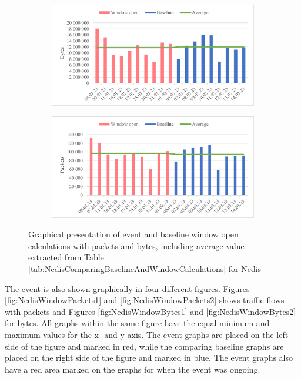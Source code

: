 \begin{figure}[H]
    \centering
    \begin{subfigure}{0.8\textwidth}
        \centering
        \includegraphics[width=1\hsize]{figures/Nedis_Window_Calculations_Bytes.png} 
    \end{subfigure}
    \begin{subfigure}{0.8\textwidth}
        \centering
        \includegraphics[width=1\hsize]{figures/Nedis_Window_Calculations_Packets.png} 
    \end{subfigure}
    \caption{Graphical presentation of event and baseline window open calculations with packets and bytes, including average value extracted from Table \ref{tab:NedisComparingBaselineAndWindowCalculations} for Nedis}
    \label{fig:NedisWindowCalculations}
\end{figure}

The event is also shown graphically in four different figures. Figures \ref{fig:NedisWindowPackets1} and \ref{fig:NedisWindowPackets2} shows traffic flows with packets and Figures \ref{fig:NedisWindowBytes1} and \ref{fig:NedisWindowBytes2} for bytes. All graphs within the same figure have the equal minimum and maximum values for the x- and y-axis. The event graphs are placed on the left side of the figure and marked in red, while the comparing baseline graphs are placed on the right side of the figure and marked in blue. The event graphs also have a red area marked on the graphs for when the event was ongoing. 

